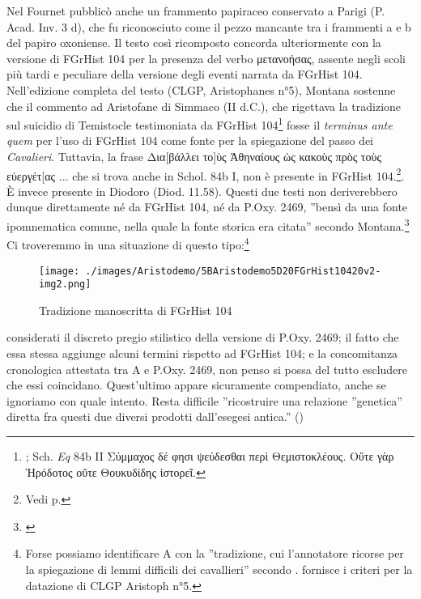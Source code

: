 Nel \cite*{Fournet2002} Fournet
pubblicò anche un frammento
papiraceo conservato a Parigi (P. Acad. Inv. 3 d), che fu riconosciuto come il pezzo mancante tra i frammenti a e b del papiro oxoniense. Il testo così
ricomposto concorda ulteriormente con la versione di
FGrHist 104 per la presenza del verbo
\textgreek{μετανοήσας}, assente negli scoli più tardi e peculiare della
versione degli eventi narrata da FGrHist 104. Nell'edizione
completa del testo (\label{ref:CLGParistoph5}CLGP,
Aristophanes
n°5), Montana sostenne che il
commento ad Aristofane di Simmaco (II d.C.), che rigettava la tradizione sul
suicidio di Temistocle
testimoniata da FGrHist
104\footnote{\cite[54]{Montana2006}; \label{bkm:scholiaaristofeq84bII} Sch.
\textit{Eq} 84b II \textgreek{Σύμμαχος δέ φησι ψεύδεσθαι περὶ Θεμιστοκλέους. Οὔτε γὰρ Ἡρόδοτος οὔτε Θουκυδίδης ἱστορεῖ}.} fosse il
\textit{terminus ante
quem} per
l'uso di FGrHist 104 come fonte per la spiegazione del passo
dei \textit{Cavalieri}. Tuttavia, la frase
\textgreek{Δια[βάλλει το]ὺς Ἀθηναίους ὡς κακοὺς πρὸς τοὺς εὐεργέτ[ας ...} che si trova
anche in Schol. 84b I, non è presente in FGrHist 104.\footnote{Vedi p.\pageref{bkm:scholiaaristofeq84b}}.
È invece presente in Diodoro (Diod. 11.58). Questi due testi non
deriverebbero dunque direttamente né da FGrHist 104, né da P.Oxy. 2469, ''bensì
da una fonte ipomnematica comune, nella quale la fonte storica era citata''
secondo Montana.\footnote{\cite*[54]{Montana2006}} Ci troveremmo in una situazione di questo
tipo:\footnote{Forse possiamo identificare A con la ''tradizione, cui
l'annotatore ricorse per la spiegazione di lemmi difficili
dei cavallieri'' secondo \cite[96]{Montana2000}. \cite[48-9]{Montana2006} fornisce i criteri per
la datazione di CLGP Aristoph n°5.}

\begin{figure}[htbp]
\begin{center}
\texttt{[image: ./images/Aristodemo/5BAristodemo5D20FGrHist10420v2-img2.png]}
\caption{Tradizione manoscritta di FGrHist 104}
\label{FGrHist104manos}
\end{center}
\end{figure}

considerati il discreto pregio stilistico della versione di P.Oxy. 2469; il
fatto che essa stessa aggiunge alcuni termini rispetto ad FGrHist 104; e la
concomitanza cronologica attestata tra A e P.Oxy. 2469, non penso si possa del tutto escludere che essi coincidano. Quest'ultimo appare
sicuramente compendiato, anche se ignoriamo con quale intento. Resta
difficile ''ricostruire una relazione ''genetica'' diretta fra questi due
diversi prodotti dall'esegesi antica.'' (\cite[96]{Montana2000})

